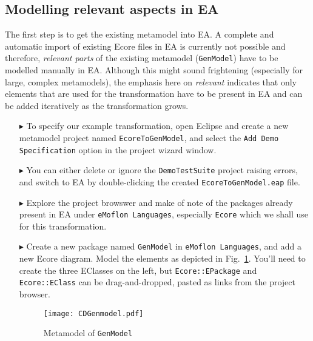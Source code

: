 \subsection{Modelling relevant aspects in EA}
\visHeader

The first step is to get the existing metamodel into EA. A complete and automatic import of existing Ecore files in EA is currently not possible and therefore,
\emph{relevant parts} of the existing metamodel (\texttt{GenModel}) have to be modelled manually in EA. Although this might sound frightening (especially for
large, complex metamodels), the emphasis here on \emph{relevant} indicates that only elements that are used for the transformation have to be present in EA and
can be added iteratively as the transformation grows.

\begin{enumerate}

\item[$\blacktriangleright$] To specify our example transformation, open Eclipse and create a new metamodel project named \texttt{EcoreToGenModel}, and select
the \texttt{Add Demo Specification} option in the project wizard window. 

\item[$\blacktriangleright$] You can either delete or ignore the \texttt{DemoTestSuite} project raising errors, and switch to EA by double-clicking the created
\texttt{Ecore\-To\-Gen\-Model.eap} file.

\item[$\blacktriangleright$] Explore the project browswer and make of note of the packages already present in EA under \texttt{eMoflon Languages}, especially
\texttt{Ecore} which we shall use for this transformation.

\item[$\blacktriangleright$] Create a new package named \texttt{GenModel} in \texttt{eMoflon Languages}, and add a new Ecore diagram. Model the elements as
depicted in Fig.~\ref{fig_gMM}. You'll need to create the three EClasses on the left, but \texttt{Ecore::EPackage} and \texttt{Ecore::EClass} can be
drag-and-dropped, pasted as links from the project browser. 

\newpage

\begin{figure}[htbp]
\begin{center}  
	\texttt{[image: CDGenmodel.pdf]}
	\caption{Metamodel of \texttt{GenModel}}  
\label{fig_gMM}
\end{center}
\end{figure} 


\end{enumerate}
